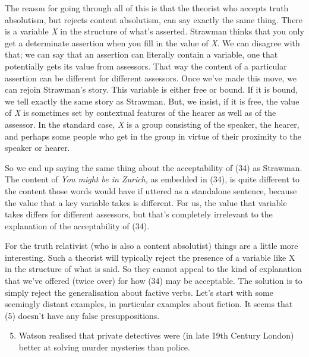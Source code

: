 {The reason for going through all of this is that the theorist who accepts truth absolutism, but rejects content absolutism, can say exactly the same thing. There is a variable }\textit{{X}}{ in the structure of what's asserted. Strawman thinks that you only get a determinate assertion when you fill in the value of }\textit{{X}}{. We can disagree with that; we can say that an assertion can literally contain a variable, one that potentially gets its value from assessors. That way the content of a particular assertion can be different for different assessors. Once we've made this move, we can rejoin Strawman's story. This variable is either free or bound. If it is bound, we tell exactly the same story as Strawman. But, we insist, if it is free, the value of }\textit{{X}}{ is sometimes set by contextual features of the hearer as well as of the assessor. In the standard case, }\textit{{X}}{ is a group consisting of the speaker, the hearer, and perhaps some people who get in the group in virtue of their proximity to the speaker or hearer.}

{So we end up saying the same thing about the acceptability of (34) as Strawman. The content of }\textit{{You might be in Zurich, }}{as embedded in (34), is quite different to the content those words would have if uttered as a standalone sentence, because the value that a key variable takes is different. For us, the value that variable takes differs for different assessors, but that's completely irrelevant to the explanation of the acceptability of (34).}

{For the truth relativist (who is also a content absolutist) things are a little more interesting. Such a theorist will typically reject the presence of a variable like X in the structure of what is said. So they cannot appeal to the kind of explanation that we've offered (twice over) for how (34) may be acceptable. The solution is to simply reject the generalisation about factive verbs. Let's start with some seemingly distant examples, in particular examples about fiction. It seems that (5) doesn't have any false presuppositions.}

\renewcommand{\labelenumi}{(\arabic{enumi})}
\begin{enumerate}
\setcounter{enumi}{4}
\item {Watson realised that private detectives were (in late 19th Century London) better at solving murder mysteries than police.}
\end{enumerate}


